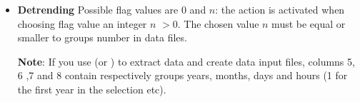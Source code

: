 \begin{itemize}
{\bf Note}: for adapting the color palette, file  contains a list of pre-existing colors and their hexadecimal codes you can use instead of names.

\item {\bf Detrending} Possible flag values are $0$ and $n$: the action is activated when choosing flag value an integer $n$ $>0$. The chosen value $n$ must be equal or smaller to groups number in data files.\par
{\bf Note}: If you use  (or ) to extract data and create data input files, columns 5, 6 ,7 and 8 contain respectively groups years, months, days and hours (1 for the first year in the selection etc).
\end{itemize}

